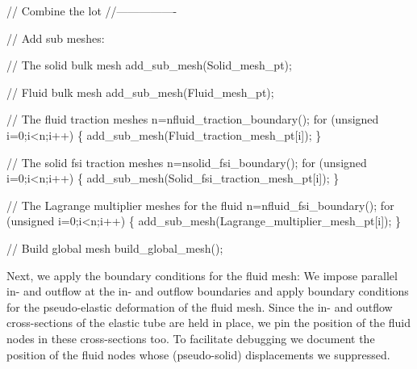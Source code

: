 \begin{DoxyCodeInclude}


 \textcolor{comment}{// Combine the lot}
 \textcolor{comment}{//----------------}
 
 \textcolor{comment}{// Add sub meshes:}

 \textcolor{comment}{// The solid bulk mesh}
 add\_sub\_mesh(Solid\_mesh\_pt);

 \textcolor{comment}{// Fluid bulk mesh}
 add\_sub\_mesh(Fluid\_mesh\_pt);
 
 \textcolor{comment}{// The fluid traction meshes}
 n=nfluid\_traction\_boundary();
 \textcolor{keywordflow}{for} (\textcolor{keywordtype}{unsigned} i=0;i<n;i++)
  \{ 
   add\_sub\_mesh(Fluid\_traction\_mesh\_pt[i]);
  \}
 
 \textcolor{comment}{// The solid fsi traction meshes}
 n=nsolid\_fsi\_boundary();
 \textcolor{keywordflow}{for} (\textcolor{keywordtype}{unsigned} i=0;i<n;i++)
  \{
   add\_sub\_mesh(Solid\_fsi\_traction\_mesh\_pt[i]);
  \}
 
 \textcolor{comment}{// The Lagrange multiplier meshes for the fluid}
 n=nfluid\_fsi\_boundary();
 \textcolor{keywordflow}{for} (\textcolor{keywordtype}{unsigned} i=0;i<n;i++)
  \{   
   add\_sub\_mesh(Lagrange\_multiplier\_mesh\_pt[i]);
  \}

 \textcolor{comment}{// Build global mesh}
 build\_global\_mesh();

\end{DoxyCodeInclude}


Next, we apply the boundary conditions for the fluid mesh\+: We impose parallel in-\/ and outflow at the in-\/ and outflow boundaries and apply boundary conditions for the pseudo-\/elastic deformation of the fluid mesh. Since the in-\/ and outflow cross-\/sections of the elastic tube are held in place, we pin the position of the fluid nodes in these cross-\/sections too. To facilitate debugging we document the position of the fluid nodes whose (pseudo-\/solid) displacements we suppressed.


